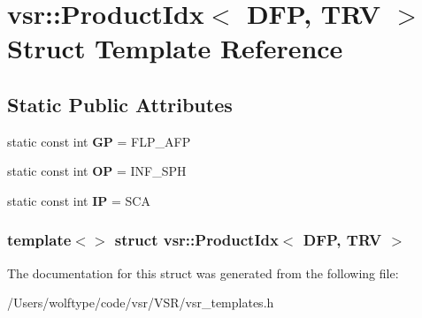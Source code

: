 \hypertarget{structvsr_1_1_product_idx_3_01_d_f_p_00_01_t_r_v_01_4}{\section{vsr\-:\-:Product\-Idx$<$ D\-F\-P, T\-R\-V $>$ Struct Template Reference}
\label{structvsr_1_1_product_idx_3_01_d_f_p_00_01_t_r_v_01_4}
}
\subsection*{Static Public Attributes}
\begin{DoxyCompactItemize}
\item 
\hypertarget{structvsr_1_1_product_idx_3_01_d_f_p_00_01_t_r_v_01_4_a381a64a92fd42d0dc6ee0543da4c062e}{static const int {\bfseries G\-P} = F\-L\-P\-\_\-\-A\-F\-P}\label{structvsr_1_1_product_idx_3_01_d_f_p_00_01_t_r_v_01_4_a381a64a92fd42d0dc6ee0543da4c062e}

\item 
\hypertarget{structvsr_1_1_product_idx_3_01_d_f_p_00_01_t_r_v_01_4_a746f8fa1dc8432e0b01992a965485e43}{static const int {\bfseries O\-P} = I\-N\-F\-\_\-\-S\-P\-H}\label{structvsr_1_1_product_idx_3_01_d_f_p_00_01_t_r_v_01_4_a746f8fa1dc8432e0b01992a965485e43}

\item 
\hypertarget{structvsr_1_1_product_idx_3_01_d_f_p_00_01_t_r_v_01_4_a8670dfaeb1dfa354715436ed4e33f22e}{static const int {\bfseries I\-P} = S\-C\-A}\label{structvsr_1_1_product_idx_3_01_d_f_p_00_01_t_r_v_01_4_a8670dfaeb1dfa354715436ed4e33f22e}

\end{DoxyCompactItemize}
\subsubsection*{template$<$$>$ struct vsr\-::\-Product\-Idx$<$ D\-F\-P, T\-R\-V $>$}



The documentation for this struct was generated from the following file\-:\begin{DoxyCompactItemize}
\item 
/\-Users/wolftype/code/vsr/\-V\-S\-R/vsr\-\_\-templates.\-h\end{DoxyCompactItemize}
